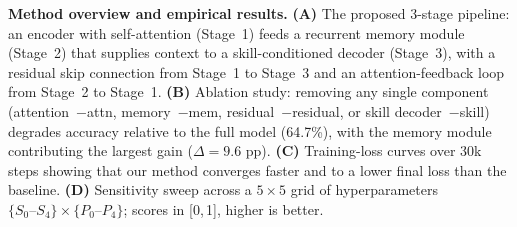\caption{\textbf{Method overview and empirical results.}
\textbf{(A)} The proposed 3-stage pipeline: an encoder with self-attention (Stage~1)
feeds a recurrent memory module (Stage~2) that supplies context to a skill-conditioned
decoder (Stage~3), with a residual skip connection from Stage~1 to Stage~3 and an
attention-feedback loop from Stage~2 to Stage~1.
\textbf{(B)} Ablation study: removing any single component (attention~$-$attn,
memory~$-$mem, residual~$-$residual, or skill decoder~$-$skill) degrades accuracy
relative to the full model (64.7\%), with the memory module contributing the largest
gain ($\Delta{=}9.6$ pp).
\textbf{(C)} Training-loss curves over 30k steps showing that our method converges
faster and to a lower final loss than the baseline.
\textbf{(D)} Sensitivity sweep across a $5{\times}5$ grid of hyperparameters
$\{S_0\text{--}S_4\}\times\{P_0\text{--}P_4\}$; scores in [0,\,1], higher is better.}
